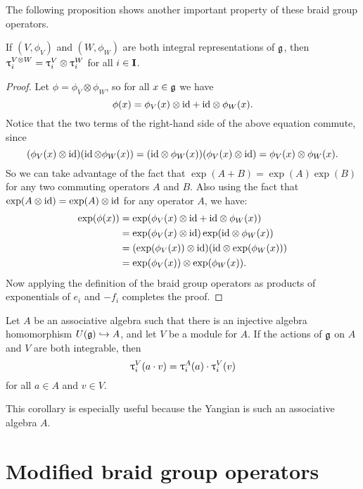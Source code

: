 The following proposition shows another important property of these braid group operators.

\begin{proposition}\label{P:tau-tensor}
    If $(V,\phi_V)$ and $(W,\phi_W)$ are both integral representations of $\mathfrak{g}$, then $\uptau_i^{V\otimes W} = \uptau_i^V\otimes\uptau_i^W$ for all $i\in\mathbf{I}$.
\end{proposition}
\begin{proof}
    Let $\phi=\phi_V\otimes\phi_W$, so for all $x\in\mathfrak{g}$ we have
    \[\phi(x) = \phi_V(x)\otimes{\operatorname{id}} + {\operatorname{id}}\otimes\phi_W(x).\]
    Notice that the two terms of the right-hand side of the above equation commute, since
    \[(\phi_V(x)\otimes{\operatorname{id}})(\operatorname{id}\otimes\phi_W(x)) = ({\operatorname{id}}\otimes\phi_W(x))(\phi_V(x)\otimes{\operatorname{id}}) = \phi_V(x)\otimes\phi_W(x).\]
    So we can take advantage of the fact that $\exp(A+B)=\exp(A)\exp(B)$ for any two commuting operators $A$ and $B$.
    Also using the fact that $\exp(A\otimes{\operatorname{id}})=\exp(A)\otimes{\operatorname{id}}$ for any operator $A$, we have:
    \begin{align*}
        \exp(\phi(x)) &= \exp(\phi_V(x)\otimes{\operatorname{id}}+{\operatorname{id}}\otimes\phi_W(x)) \\
        &= \exp(\phi_V(x)\otimes{\operatorname{id}})\exp({\operatorname{id}}\otimes\phi_W(x)) \\
        &= (\exp(\phi_V(x))\otimes{\operatorname{id}})({\operatorname{id}}\otimes\exp(\phi_W(x))) \\
        &= \exp(\phi_V(x))\otimes\exp(\phi_W(x)).
    \end{align*}
    Now applying the definition of the braid group operators as products of exponentials of $e_i$ and $-f_i$ completes the proof.
\end{proof}

\begin{corollary}\label{C:tau-alg}
    Let $A$ be an associative algebra such that there is an injective algebra homomorphism $U(\mathfrak{g})\hookrightarrow A$, and let $V$ be a module for $A$.
    If the actions of $\mathfrak{g}$ on $A$ and $V$ are both integrable, then
    \[\uptau_i^V(a\cdot v) = \uptau_i^A(a)\cdot\uptau_i^V(v)\]
    for all $a\in A$ and $v\in V$.
\end{corollary}

This corollary is especially useful because the Yangian is such an associative algebra $A$.


\section{Modified braid group operators}

